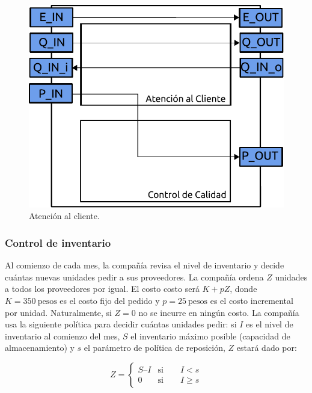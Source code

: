 \documentclass[10pt]{article}
\begin{document}
\begin{figure}[h]
\centering
\includegraphics[scale=0.8]{img/figura5}
\caption{Atención al cliente.}
\label{fig:fig5}
\end{figure}
\FloatBarrier

\subsubsection{Control de inventario\label{sec:CID}}

Al comienzo de cada mes, la compañía revisa el nivel de inventario y decide cuántas nuevas unidades pedir a sus proveedores. La compañía ordena $Z$ unidades a todos los proveedores por igual. El costo costo será $K + pZ$, donde $K = 350~\textrm{pesos}$ es el costo fijo del pedido y $p = 25~\textrm{pesos}$ es el costo incremental por unidad. Naturalmente, si $Z = 0$ no se incurre en ningún costo. La compañía usa la siguiente política para decidir cuántas unidades pedir: si $I$ es el nivel de inventario al comienzo del mes, $S$ el inventario máximo posible (capacidad de almacenamiento) y $s$ el parámetro de política de reposición, $Z$ estará dado por:

\begin{equation}
Z=\left\{\begin{array}{lr}
		S – I & \textrm{si}\qquad I < s\\
		0 & \textrm{si} \qquad I \geq s
	\end{array}\right.
\label{eq:ctrlinv}
\end{equation}
\end{document}
